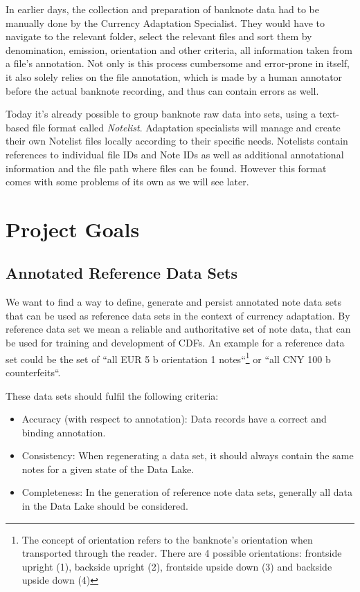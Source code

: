 In earlier days, the collection and preparation of banknote data had to be manually done by the Currency Adaptation Specialist. They would have to navigate to the relevant folder, select the relevant files and sort them by denomination, emission, orientation and other criteria, all information taken from a file's annotation. Not only is this process cumbersome and error-prone in itself, it also solely relies on the file annotation, which is made by a human annotator before the actual banknote recording, and thus can contain errors as well.\par
Today it's already possible to group banknote raw data into sets, using a text-based file format called \emph{Notelist}. Adaptation specialists will manage and create their own Notelist files locally according to their specific needs. Notelists contain references to individual file IDs and Note IDs as well as additional annotational information and the file path where files can be found. However this format comes with some problems of its own as we will see later.\par


\section{Project Goals}
\label{sec:goals}

\subsection{Annotated Reference Data Sets}
\label{subsection:goal_1}
We want to find a way to define, generate and persist annotated note data sets that can be used as reference data sets in the context of currency adaptation. By reference data set we mean a reliable and authoritative set of note data, that can be used for training and development of CDFs. An example for a reference data set could be the set of ``all EUR 5 b orientation 1 notes``\footnote{The concept of orientation refers to the banknote's orientation when transported through the reader. There are 4 possible orientations: frontside upright (1), backside upright (2), frontside upside down (3) and backside upside down (4)} or ``all CNY 100 b counterfeits``.\par 
These data sets should fulfil the following criteria:
\begin{itemize}
\item Accuracy (with respect to annotation): Data records have a correct and binding annotation.
\item Consistency: When regenerating a data set, it should always contain the same notes for a given state of the Data Lake.
\item Completeness: In the generation of reference note data sets, generally all data in the Data Lake should be considered.
\end{itemize}


